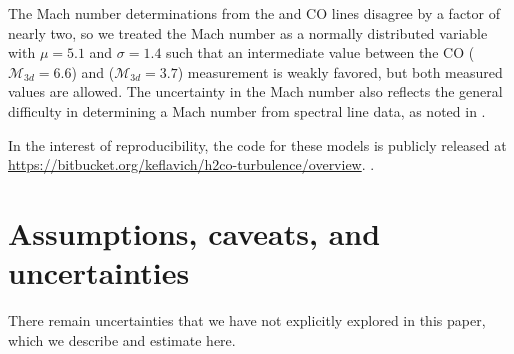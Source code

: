 The Mach number determinations from the \formaldehyde and CO lines disagree by
a factor of nearly two, so we treated the Mach number as a normally distributed
variable with $\mu=5.1$ and $\sigma=1.4$ such that an intermediate value
between the CO ($\mathcal{M}_{3d} = 6.6$) and \formaldehyde ($\mathcal{M}_{3d}
= 3.7$) measurement is weakly favored, but both measured values are allowed.
The uncertainty in the Mach number also reflects the general difficulty in determining
a Mach number from spectral line data, as noted in \citet{Schneider2013a}.

In the interest of reproducibility, the code for these models is publicly
released at \url{https://bitbucket.org/keflavich/h2co-turbulence/overview}.
.

% 
% 
% 

\section{Assumptions, caveats, and uncertainties}
There remain uncertainties that we have not explicitly explored in this paper,
which we describe and estimate here.

